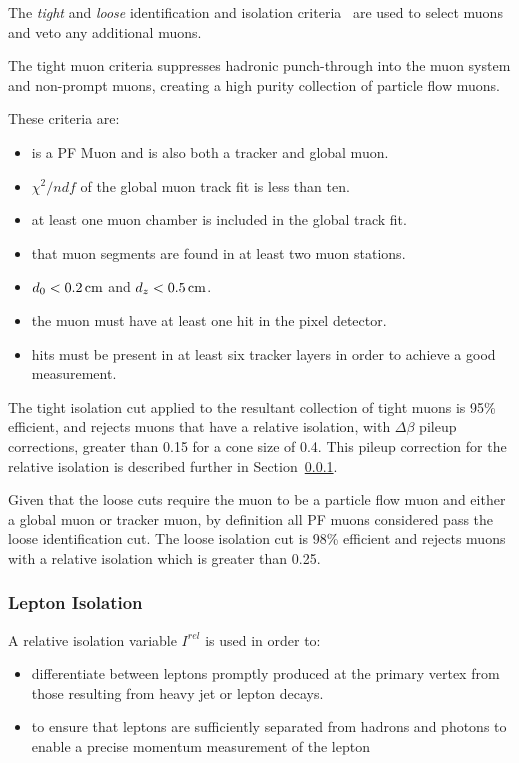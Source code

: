 The \emph{tight} and \emph{loose} identification and isolation criteria~\cite{Chatrchyan:2012xi} are used to select muons and veto any additional muons.

The tight muon criteria suppresses hadronic punch-through into the muon system and non-prompt muons, creating a high purity collection of particle flow muons.

These criteria are:
\begin{itemize}
\item is a PF Muon and is also both a tracker and global muon.
\item $\chi^{2}/ndf$ of the global muon track fit is less than ten. 
\item at least one muon chamber is included in the global track fit.
\item that muon segments are found in at least two muon stations.
\item $d_{0} < 0.2\,\text{cm}$ and $d_{z} < 0.5\,\text{cm}$.
\item the muon must have at least one hit in the pixel detector.
\item hits must be present in at least six tracker layers in order to achieve a good \pT measurement.
\end{itemize}

The tight isolation cut applied to the resultant collection of tight muons is 95\% efficient, and rejects muons that have a relative isolation, with $\Delta\beta$ pileup corrections, greater than 0.15 for a cone size of 0.4.
This pileup correction for the relative isolation is described further in Section~\ref{subsubsec:relIso}.

Given that the loose cuts require the muon to be a particle flow muon and either a global muon or tracker muon, by definition all PF muons considered pass the loose identification cut.
The loose isolation cut is 98\% efficient and rejects muons with a relative isolation which is greater than 0.25.

\subsubsection{Lepton Isolation}\label{subsubsec:relIso}
A relative isolation variable $I^{rel}$ is used in order to:
\begin{itemize}
\item differentiate between leptons promptly produced at the primary vertex from those resulting from heavy jet or lepton decays.
\item to ensure that leptons are sufficiently separated from hadrons and photons to enable a precise momentum measurement of the lepton 
\end{itemize}

